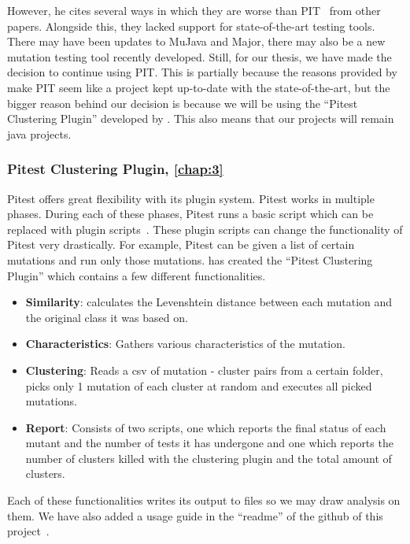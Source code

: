 \documentclass[twoside]{uva-inf-bachelor-thesis}
\begin{document}
However, he cites several ways in which they are worse than PIT~\cite{pit} from other papers. Alongside this, they lacked support for state-of-the-art testing tools. There may have been updates to MuJava and Major, there may also be a new mutation testing tool recently developed. Still, for our thesis, we have made the decision to continue using PIT. This is partially because the reasons provided by \textcite{Basarat21} make PIT seem like a project kept up-to-date with the state-of-the-art, but the bigger reason behind our decision is because we will be using the ``Pitest Clustering Plugin'' developed by \textcite{Basarat21}. This also means that our projects will remain java projects.

\subsubsection{Pitest Clustering Plugin, \textbf{\cref{chap:3}}}
Pitest offers great flexibility with its plugin system. Pitest works in multiple phases. During each of these phases, Pitest runs a basic script which can be replaced with plugin scripts~\cite{pitAdvanced}. These plugin scripts can change the functionality of Pitest very drastically. For example, Pitest can be given a list of certain mutations and run only those mutations. \textcite{Basarat21} has created the ``Pitest Clustering Plugin'' which contains a few different functionalities.

\begin{itemize}
    \item \textbf{Similarity}: calculates the Levenshtein distance between each mutation and the original class it was based on.
    \item \textbf{Characteristics}: Gathers various characteristics of the mutation.
    \item \textbf{Clustering}: Reads a csv of mutation - cluster pairs from a certain folder, picks only 1 mutation of each cluster at random and executes all picked mutations.
    \item \textbf{Report}: Consists of two scripts, one which reports the final status of each mutant and the number of tests it has undergone and one which reports the number of clusters killed with the clustering plugin and the total amount of clusters.
\end{itemize}

Each of these functionalities writes its output to files so we may draw analysis on them. We have also added a usage guide in the ``readme'' of the github of this project~\cite{aAbdalla-repo}.
\end{document}
